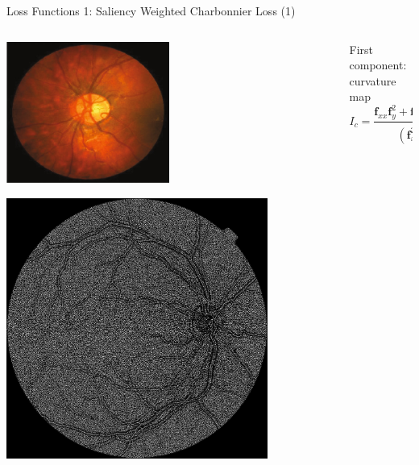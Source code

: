 \documentclass{beamer}
\newcommand{\img}{\bm{f}} %
\begin{document}
\begin{frame}{Loss Functions 1: Saliency Weighted Charbonnier Loss (1)}
\begin{columns}
  \begin{column}{0.5\linewidth}
      \centering
      \includegraphics[width=0.5\textwidth]{saliency_gt}

      \includegraphics[width=0.8\textwidth]{saliency_vessels}
  \end{column}
  \begin{column}{0.6\linewidth}
  First component: curvature map
\begin{equation}
 I_c = \frac{\img_{xx} \img_y^2 + \img_{yy} \img_x^2 - 2 \img_{x} \img_{xy} \img_{y} }{(\img_x^2 + \img_y^2)^{1.5}}
\end{equation}
\end{column} 
\end{columns}

\end{frame}
\end{document}
